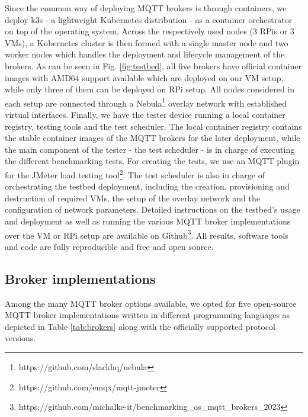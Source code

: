 \documentclass[conference]{IEEEtran}
\begin{document}
Since the common way of deploying MQTT brokers is through containers, we deploy k3s - a lightweight
Kubernetes distribution - as a container orchestrator on top of the operating system. Across the
respectively used nodes (3 RPis or 3 VMs), a Kubernetes cluster is then formed with a single master
node and two worker nodes which handles the deployment and lifecycle management of the brokers. As
can be seen in Fig. \ref{fig:testbed}, all five brokers have official container images with AMD64
support available which are deployed on our VM setup, while only three of them can be deployed on
RPi setup. All nodes considered in each setup are connected through a Nebula\footnote{https://github.com/slackhq/nebula} overlay network with established virtual interfaces.
Finally, we have the tester device running a local container registry, testing tools and the test
scheduler. The local container registry contains the stable container images of the MQTT brokers for
the later deployment, while the main component of the tester - the test scheduler - is in charge of
executing the different benchmarking tests. For creating the tests, we use an MQTT plugin for the
JMeter load testing tool\footnote{https://github.com/emqx/mqtt-jmeter}. The test scheduler is also
in charge of orchestrating the testbed deployment, including the creation, provisioning and
destruction of required VMs, the setup of the overlay network and the configuration of network
parameters. Detailed instructions on the testbed’s usage and deployment as well as running the
various MQTT broker implementations over the VM or RPi setup are available on Github\footnote{https://github.com/michalke-it/benchmarking\_os\_mqtt\_brokers\_2023}. All results, software tools and code are fully reproducible and free and open source. 


\subsection{Broker implementations}


Among the many MQTT broker options available, we opted for five open-source MQTT broker implementations written in different programming languages as depicted in Table \ref{tab:brokers} along with the officially supported protocol versions.
\end{document}
